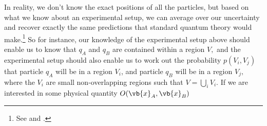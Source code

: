 \documentclass[12pt]{report}
\providecommand{\DIFadd}[1]{{\protect\color{blue}\uwave{#1}}} %
\providecommand{\DIFaddbegin}{} %
\providecommand{\DIFaddend}{} %
\providecommand{\DIFdelbegin}{} %
\providecommand{\DIFdelend}{} %
\begin{document}
In reality, we don't know the exact positions of all the particles, but based on what we know about an experimental setup, we can average over our uncertainty and recover exactly the same predictions that standard quantum theory would make.\footnote{See \cite{BohmDavid1952A} and \cite{BohmDavid1952B}.} So for instance, our knowledge of the experimental setup above should enable us  to know that $q_A$ and $q_B$ are contained within a \DIFaddbegin \DIFadd{bounded }\DIFaddend region $V,$ %
\DIFdelbegin %
\DIFdelend \DIFaddbegin {}\DIFaddend %
and the experimental setup should also enable us to work out the probability  $p(V_i, V_j)$ %
%
that particle $q_A$  will be in a region $V_i$, and particle $q_B$ will be in a region $V_j,$ where the $V_i$ are small non-overlapping regions such that $V=\bigcup_iV_i$. %
%
If we are interested in some physical quantity $O(\vb{x}_A, \vb{x}_B)$ %
\DIFdelbegin %
\DIFdelend \DIFaddbegin {}\DIFaddend %
\end{document}
